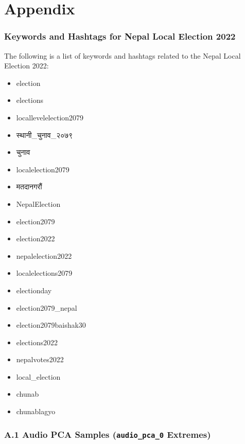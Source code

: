 \documentclass[12pt,a4paper]{report}
\begin{document}
\chapter{Appendix}

\subsection*{Keywords and Hashtags for Nepal Local Election 2022}
\label{appendix:keywords}
The following is a list of keywords and hashtags related to the Nepal Local Election 2022:

\begin{itemize}
    \item election
    \item elections
    \item locallevelelection2079
    \item \texthindi{स्थानी\_चुनाव\_२०७९}
    \item \texthindi{चुनाव}
    \item localelection2079
    \item \texthindi{मतदानगरौं}
    \item NepalElection
    \item election2079
    \item election2022
    \item nepalelection2022
    \item localelections2079
    \item electionday
    \item election2079\_nepal
    \item election2079baishak30
    \item elections2022
    \item nepalvotes2022
    \item local\_election
    \item chunab
    \item chunablagyo
\end{itemize}

\subsection*{A.1 Audio PCA Samples (\texttt{audio\_pca\_0} Extremes)}
\end{document}

